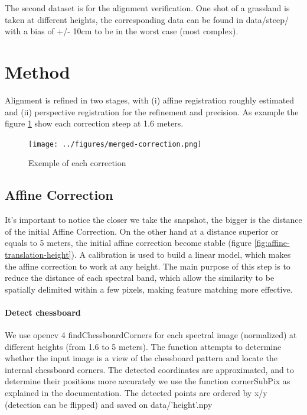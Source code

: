 \documentclass[]{elsarticle}
\begin{document}
	The second dataset is for the alignment verification. One shot of a grassland is taken at different heights, the corresponding data can be found in data/steep/
	with a bias of +/- 10cm to be in the worst case (most complex).
	
	\newpage
	\section{Method}
	
	Alignment is refined in two stages, with
	(i) affine registration roughly estimated
	and (ii) perspective registration for the refinement and precision.
	As example the figure \ref{fig:merged-correction} show each correction steep at 1.6 meters.
	
	\begin{figure}[!htb]
		\centering
		\texttt{[image: ../figures/merged-correction.png]}
		\caption{Exemple of each correction}
		\label{fig:merged-correction}
	\end{figure}
	
	\subsection{Affine Correction}
	
	It's important to notice the closer we take the snapshot, the bigger is the distance of the initial Affine Correction.
	On the other hand at a distance superior or equals to 5 meters, the initial affine correction become stable (figure \ref{fig:affine-translation-height}).
	A calibration is used to build a linear model, which makes the affine correction to work at any height.
	The main purpose of this step is to reduce the distance of each spectral band,
	which allow the similarity to be spatially delimited within a few pixels, making feature matching more effective.
	
	\paragraph{Detect chessboard} We use opencv 4 findChessboardCorners for each spectral image (normalized) at different heights (from 1.6 to 5 meters).
	The function attempts to determine whether the input image is a view of the chessboard pattern and locate the internal chessboard corners.
	The detected coordinates are approximated, and to determine their positions more accurately we use the function cornerSubPix as explained in the documentation.
	The detected points are ordered by x/y (detection can be flipped) and saved on data/'height'.npy
	
\end{document}
